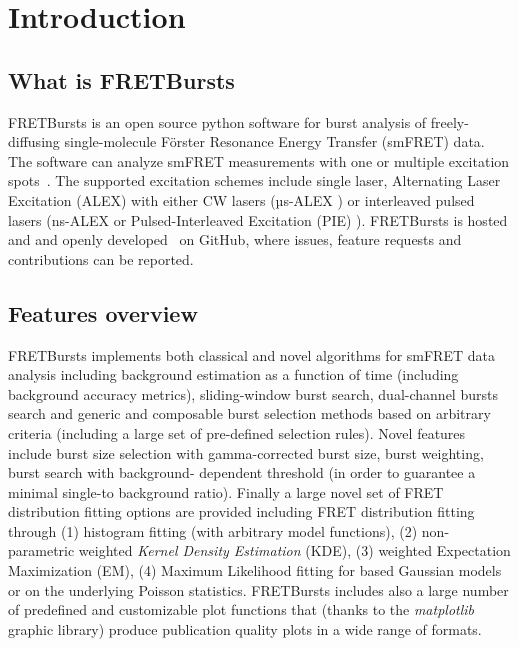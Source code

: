 \section{Introduction}

\subsection{What is FRETBursts}

FRETBursts is an open source python software for burst analysis of freely-diffusing 
single-molecule Förster Resonance Energy Transfer (smFRET) data. 
The software can analyze smFRET measurements
with one or multiple excitation spots~\cite{Ingargiola_2013}. The supported 
excitation schemes include single laser, Alternating Laser Excitation (ALEX) 
with either CW lasers (µs-ALEX \cite{Kapanidis_2005}) 
or interleaved pulsed lasers (ns-ALEX \cite{Laurence_2005} or 
Pulsed-Interleaved Excitation (PIE) \cite{M_ller_2005}). 
FRETBursts is hosted and and openly developed~\cite{Prli__2012} on GitHub, where
issues, feature requests and contributions can be reported.

\subsection{Features overview}

FRETBursts implements both classical and novel algorithms for smFRET data analysis 
including background estimation as a function of time (including background accuracy 
metrics), sliding-window burst search, dual-channel bursts search and
generic and composable burst selection methods based on arbitrary criteria 
(including a large set of pre-defined selection rules). Novel features include burst size
selection with gamma-corrected burst size, burst weighting, burst search with background-
dependent threshold (in order to guarantee a minimal single-to background ratio).
Finally a large novel set of FRET distribution fitting options are provided including
FRET distribution fitting through (1) histogram fitting (with arbitrary model functions), 
(2)  non-parametric weighted \textit{Kernel Density Estimation} (KDE), (3) weighted 
Expectation Maximization (EM), (4) Maximum Likelihood fitting for based Gaussian models 
or on the underlying Poisson statistics. FRETBursts includes also a large number of
predefined and customizable plot functions that (thanks to the \textit{matplotlib} 
graphic library) produce publication quality plots in a wide range of formats.

